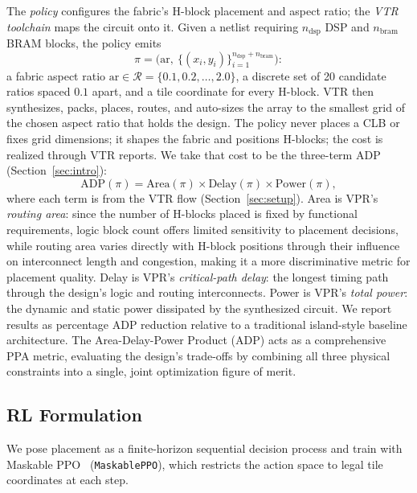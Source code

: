 \documentclass[sigconf]{acmart}
\begin{document}
The \emph{policy} configures the fabric's H-block placement and aspect
ratio; the \emph{VTR toolchain} maps the circuit onto it. Given a netlist requiring
$n_{\mathrm{dsp}}$ DSP and $n_{\mathrm{bram}}$ BRAM blocks, the policy emits
\begin{equation}
\label{eq:policy}
  \pi = \Big(\mathrm{ar},\ \{(x_i,y_i)\}_{i=1}^{n_{\mathrm{dsp}}+n_{\mathrm{bram}}}\Big):
\end{equation}
a fabric aspect ratio $\mathrm{ar} \in \mathcal{R} = \{0.1, 0.2, \ldots, 2.0\}$,
a discrete set of 20 candidate ratios spaced $0.1$ apart, and a tile
coordinate for every H-block. VTR then synthesizes, packs, places, routes, and auto-sizes
the array to the smallest grid of the chosen aspect ratio that holds the design.
The policy never places a CLB or fixes grid dimensions; it shapes the fabric
and positions H-blocks; the cost is realized through VTR reports.
We take that cost to be the three-term ADP (Section~\ref{sec:intro}):
\begin{equation}
\label{eq:adp}
  \mathrm{ADP}(\pi) = \mathrm{Area}(\pi) \times \mathrm{Delay}(\pi) \times \mathrm{Power}(\pi),
\end{equation}
where each term is from the VTR flow (Section~\ref{sec:setup}). Area is
VPR's \emph{routing area}: since the number of H-blocks placed is fixed
by functional requirements, logic block count offers limited sensitivity to
placement decisions, while routing area varies directly with H-block
positions through their influence on interconnect length and congestion,
making it a more discriminative metric for placement quality. Delay is
VPR's \emph{critical-path delay}: the longest timing path through the design's logic and routing interconnects. Power is VPR's \emph{total power}:
the dynamic and static power dissipated by the synthesized circuit. We
report results as percentage ADP reduction relative to a traditional
island-style baseline architecture. The Area-Delay-Power Product (ADP) acts as a comprehensive PPA metric, evaluating the design's trade-offs by combining all three physical constraints into a single, joint optimization figure of merit.

\subsection{RL Formulation}
\label{sec:rl}

We pose placement as a finite-horizon sequential decision process and train
with Maskable PPO~\cite{maskableppo} (\texttt{MaskablePPO}), which restricts
the action space to legal tile coordinates at each step.
\end{document}
